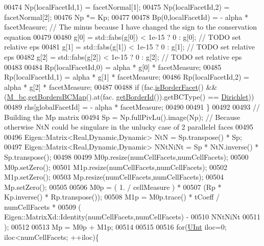 \begin{DoxyCode}
00474             Np(localFacetId,1) = facetNormal[1];
00475             Np(localFacetId,2) = facetNormal[2];
00476             Np *= Kp;
00477 
00478             Bp(0,localFacetId) =  - alpha * facetMeasure;    \textcolor{comment}{// The minus because I have changed the sign
       to the conservation equation}
00479 
00480             g[0] = std::fabs(g[0]) < 1e-15 ? 0 : g[0]; \textcolor{comment}{// TODO set relative eps}
00481             g[1] = std::fabs(g[1]) < 1e-15 ? 0 : g[1]; \textcolor{comment}{// TODO set relative eps}
00482             g[2] = std::fabs(g[2]) < 1e-15 ? 0 : g[2]; \textcolor{comment}{// TODO set relative eps}
00483 
00484             Rp(localFacetId,0) = alpha * g[0] * facetMeasure;
00485             Rp(localFacetId,1) = alpha * g[1] * facetMeasure;
00486             Rp(localFacetId,2) = alpha * g[2] * facetMeasure;
00487 
00488             \textcolor{keywordflow}{if} (fac.\hyperlink{classFVCode3D_1_1Rigid__Mesh_1_1Facet_af84dc398fca7867ff763bfca119ddc16}{isBorderFacet}() && (\hyperlink{classFVCode3D_1_1StiffMatrix_a23e3ffc97fcf112958e9966cac41e9d3}{M\_bc}.\hyperlink{classFVCode3D_1_1BoundaryConditions_a5b53a81bdab88709fae14892bfe6a7c9}{getBordersBCMap}().at(fac.
      \hyperlink{classFVCode3D_1_1Rigid__Mesh_1_1Facet_a528828e73f43ae6fa5c858ecc5ab5a65}{getBorderId}()).getBCType() == \hyperlink{namespaceFVCode3D_a73660061f11f1671164ce171a053f8c5a192024697bdaa4fbbb39b8961b747bce}{Dirichlet}))
00489                 rhs[globalFacetId] = - alpha * facetMeasure;
00490 
00491         \}
00492 
00493                 \textcolor{comment}{// Building the Mp matrix}
00494         Sp = Np.fullPivLu().image(Np);    \textcolor{comment}{// Because otherwise NtN could be singulare in the unlucky case
       of 2 parallelel faces}
00495 
00496         Eigen::Matrix<Real,Dynamic,Dynamic> NtN = Sp.transpose() * Sp;
00497         Eigen::Matrix<Real,Dynamic,Dynamic> NNtNiNt = Sp * NtN.inverse() * Sp.transpose();
00498 
00499         M0p.resize(numCellFacets,numCellFacets);
00500         M0p.setZero();
00501         M1p.resize(numCellFacets,numCellFacets);
00502         M1p.setZero();
00503         Mp.resize(numCellFacets,numCellFacets);
00504         Mp.setZero();
00505 
00506         M0p = ( 1. / cellMeasure ) *
00507               (Rp * Kp.inverse() * Rp.transpose());
00508         M1p = M0p.trace() * tCoeff / numCellFacets *
00509               ( Eigen::MatrixXd::Identity(numCellFacets,numCellFacets) -
00510                 NNtNiNt
00511               );
00512 
00513         Mp  = M0p + M1p;
00514 
00515 
00516         \textcolor{keywordflow}{for}(\hyperlink{namespaceFVCode3D_a4bf7e328c75d0fd504050d040ebe9eda}{UInt} iloc=0; iloc<numCellFacets; ++iloc)\{

\end{DoxyCode}
